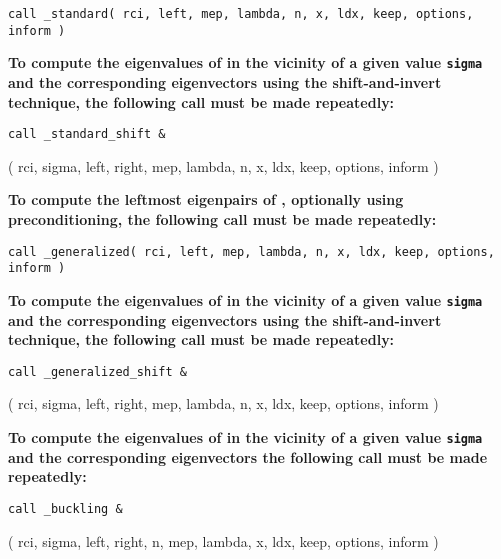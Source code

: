\documentclass{spral}
\begin{document}
\medskip
{\tt call
\solver\_standard( rci, left, mep, lambda, n, x, ldx, keep, options, inform )
}

\medskip
\noindent
{\bf
To compute the eigenvalues of  %
in the vicinity of 
a given value {\tt sigma}
and the corresponding eigenvectors using the shift-and-invert technique,
the following call must be made repeatedly:
}

\medskip
{\tt call
\solver\_standard\_shift \&

\hspace{8mm} 
( rci, sigma, left, right, mep, lambda, n, x, ldx, keep, options, inform )
}

\medskip
\noindent
{\bf
To compute %
the leftmost eigenpairs of ,
optionally using preconditioning,
the following call must be made repeatedly:
}

\medskip
{\tt call
\solver\_generalized( rci, left, mep, lambda, n, x, ldx, keep, options, inform )
}

\medskip
\noindent
{\bf
To compute the eigenvalues of  %
in the vicinity of 
a given value {\tt sigma}
and the corresponding eigenvectors using the shift-and-invert technique,
the following call must be made repeatedly:
}

\medskip
{\tt call
\solver\_generalized\_shift \&

\hspace{8mm} 
( rci, sigma, left, right, mep, lambda, n, x, ldx, keep, options, inform )
}

\medskip
\noindent
{\bf
To compute the eigenvalues of  %
in the vicinity of 
a given value {\tt sigma}
and the corresponding eigenvectors %
the following call must be made repeatedly:
}

\medskip
{\tt call
\solver\_buckling \&

\hspace{8mm} 
( rci, sigma, left, right, n, mep, lambda, x, ldx, keep, options, inform )
}

\end{document}
